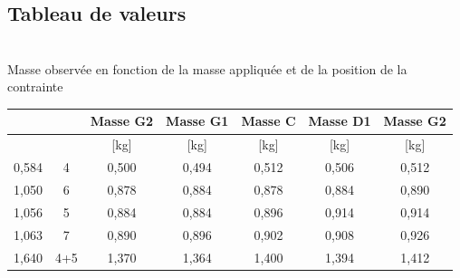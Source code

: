 \documentclass[11pt,a4paper]{report}
\begin{document}
\subsection*{Tableau de valeurs}
\begin{center}
~\\
Masse observée en fonction de la masse appliquée et de la position de la contrainte
\begin{tabular}{|c|c|c|c|c|c|c|}
\hline
\rowcolor[HTML]{036400} 
\cellcolor[HTML]{963400}{\color[HTML]{FFFFFF} N}        & \cellcolor[HTML]{963400}{\color[HTML]{FFFFFF} N} & {\color[HTML]{FFFFFF} Masse G2} & {\color[HTML]{FFFFFF} Masse G1} & {\color[HTML]{FFFFFF} Masse C}  & {\color[HTML]{FFFFFF} Masse D1} & {\color[HTML]{FFFFFF} Masse G2} \\ \hline
\rowcolor[HTML]{E7F7E7} 
\cellcolor[HTML]{FFECE2}{\color[HTML]{963400} {[}kg{]}} & \cellcolor[HTML]{FFECE2}{\color[HTML]{963400} }  & {\color[HTML]{036400} {[}kg{]}} & {\color[HTML]{036400} {[}kg{]}} & {\color[HTML]{036400} {[}kg{]}} & {\color[HTML]{036400} {[}kg{]}} & {\color[HTML]{036400} {[}kg{]}} \\ \hline
{\color[HTML]{963400} 0,584}                            & {\color[HTML]{963400} 4}                         & {\color[HTML]{036400} 0,500}    & {\color[HTML]{036400} 0,494}    & {\color[HTML]{036400} 0,512}    & {\color[HTML]{036400} 0,506}    & {\color[HTML]{036400} 0,512}    \\ \hline
{\color[HTML]{963400} 1,050}                            & {\color[HTML]{963400} 6}                         & {\color[HTML]{036400} 0,878}    & {\color[HTML]{036400} 0,884}    & {\color[HTML]{036400} 0,878}    & {\color[HTML]{036400} 0,884}    & {\color[HTML]{036400} 0,890}    \\ \hline
{\color[HTML]{963400} 1,056}                            & {\color[HTML]{963400} 5}                         & {\color[HTML]{036400} 0,884}    & {\color[HTML]{036400} 0,884}    & {\color[HTML]{036400} 0,896}    & {\color[HTML]{036400} 0,914}    & {\color[HTML]{036400} 0,914}    \\ \hline
{\color[HTML]{963400} 1,063}                            & {\color[HTML]{963400} 7}                         & {\color[HTML]{036400} 0,890}    & {\color[HTML]{036400} 0,896}    & {\color[HTML]{036400} 0,902}    & {\color[HTML]{036400} 0,908}    & {\color[HTML]{036400} 0,926}    \\ \hline
{\color[HTML]{963400} 1,640}                            & {\color[HTML]{963400} 4+5}                       & {\color[HTML]{036400} 1,370}    & {\color[HTML]{036400} 1,364}    & {\color[HTML]{036400} 1,400}    & {\color[HTML]{036400} 1,394}    & {\color[HTML]{036400} 1,412}    \\ \hline

\end{tabular}
\end{center}
\end{document}
